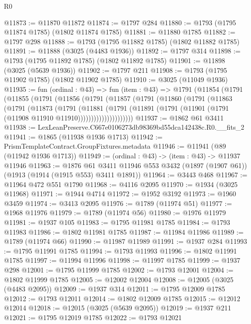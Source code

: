 \begin{lexlean}{R0}
\begin{coremodule}
@11873 := @11870 @11872
@11874 := @1797 @284
@11880 := @1793 (@1795 @11874 @1785) (@1802 @11874 @1785)
@11881 := @11880 @1785
@11882 := @1797 @298
@11888 := @1793 (@1795 @11882 @1785) (@1802 @11882 @1785)
@11891 := @11888 (@3025 (@4483 @1936))
@11892 := @1797 @314
@11898 := @1793 (@1795 @11892 @1785) (@1802 @11892 @1785)
@11901 := @11898 (@3025 (@5639 @1936))
@11902 := @1797 @211
@11908 := @1793 (@1795 @11902 @1785) (@1802 @11902 @1785)
@11910 := @3025 (@11049 @1936)
@11935 := fun (ordinal : @43) =>
  fun (item : @43) =>
  @1791
    (@11854
      (@1791
        (@11855
          (@1791
            (@11856
              (@1791
                (@11857
                  (@1791
                    (@11860
                      (@1791
                        (@11863
                          (@1791
                            (@11873
                              (@1791
                                (@11881
                                  (@1791
                                    (@11891
                                      (@1791
                                        (@11901 (@1791 (@11908 @11910 @11910)))))))))))))))))))))
@11937 := @1862 @61 @3411
@11938 := LexLeanPreserve.C667e0106273db98369bd55dca142438c.R0.__fits_2
@11941 := @1865 (@11938 @1936 @1713)
@11942 := PrismTemplateContract.GroupFixtures.metadata
@11946 := @11941 (@89 (@11942 @1936 @1713))
@11949 := (ordinal : @43) -> (item : @43) -> @11937 @11946
@11963 := @1876
    @61
    @3411
    @11946
    @553
    @3432
    (@1897 (@1907 @61))
    (@1913 (@1914 (@1915 @553) @3411 @1891))
@11964 := @3443 @468
@11967 := @11964 @472 @551 @1790
@11968 := @4116 @2095
@11970 := @1934 (@3025 @11968)
@11971 := @1944 @4714
@11972 := @1952 @3192
@11973 := @1960 @3459
@11974 := @3413 @2095
@11976 := @1789 (@11974 @51)
@11977 := @1968 @11976
@11979 := @1789 (@11974 @56)
@11980 := @1976 @11979
@11981 := @1937 @105
@11983 := @1795 @11981 @1785
@11984 := @1793 @11983
@11986 := @1802 @11981 @1785
@11987 := @11984 @11986
@11989 := @1789 (@11974 @66)
@11990 := @11987 @11989
@11991 := @1937 @284
@11993 := @1795 @11991 @1785
@11994 := @1793 @11993
@11996 := @1802 @11991 @1785
@11997 := @11994 @11996
@11998 := @11997 @1785
@11999 := @1937 @298
@12001 := @1795 @11999 @1785
@12002 := @1793 @12001
@12004 := @1802 @11999 @1785
@12005 := @12002 @12004
@12008 := @12005 (@3025 (@4483 @2095))
@12009 := @1937 @314
@12011 := @1795 @12009 @1785
@12012 := @1793 @12011
@12014 := @1802 @12009 @1785
@12015 := @12012 @12014
@12018 := @12015 (@3025 (@5639 @2095))
@12019 := @1937 @211
@12021 := @1795 @12019 @1785
@12022 := @1793 @12021

\end{coremodule}
\end{lexlean}
